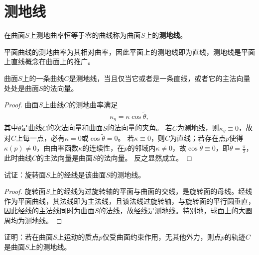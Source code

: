 \documentclass[../../main.tex]{subfiles}%
\begin{document}
\section{测地线}

\begin{definition}
在曲面$S$上测地曲率恒等于零的曲线称为曲面$S$上的\textbf{测地线}。
\end{definition}

\begin{remark}
平面曲线的测地曲率为其相对曲率，因此平面上的测地线即为直线，测地线是平面上直线概念在曲面上的推广。
\end{remark}

\begin{theorem}
曲面$S$上的一条曲线$C$是测地线，当且仅当它或者是一条直线，或者它的主法向量处处是曲面$S$的法向量。
\end{theorem}

\begin{proof}

曲面$S$上曲线$C$的测地曲率满足
\begin{align}
\kappa_g = \kappa \cos\tilde{\theta},
\end{align}
其中$\tilde{\theta}$是曲线$C$的次法向量和曲面$S$的法向量的夹角。
若$C$为测地线，则$\kappa_g \equiv 0$，故对$C$上每一点，必有$\kappa=0$或$\cos\tilde{\theta}=0$。
若$\kappa \equiv 0$，则$C$为直线；若存在点$p$使得$\kappa(p)\neq0$，由曲率函数$\kappa$的连续性，在$p$的邻域内$\kappa\neq0$，故$\cos\tilde{\theta}\equiv0$，即$\tilde{\theta}=\frac{\pi}{2}$，此时曲线$C$的主法向量是曲面$S$的法向量。
反之显然成立。

\end{proof}

\begin{example}
试证：旋转面$S$上的经线是该曲面$S$的测地线。
\end{example}

\begin{proof}

旋转面$S$上的经线为过旋转轴的平面与曲面的交线，是旋转面的母线。经线作为平面曲线，其法线即为主法线，且该法线过旋转轴，与旋转面的平行圆垂直，因此经线的主法线同时为曲面$S$的法线，故经线是测地线。特别地，球面上的大圆周均为测地线。

\end{proof}

\begin{example}
证明：若在曲面$S$上运动的质点$p$仅受曲面约束作用，无其他外力，则点$p$的轨迹$C$是曲面$S$上的测地线。
\end{example}
\end{document}
